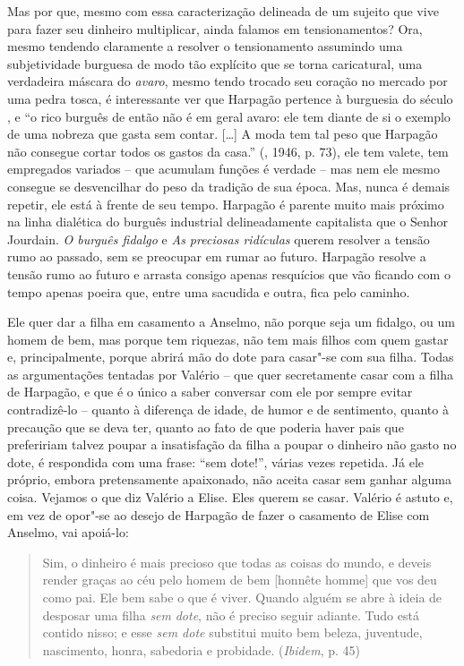 Mas por que, mesmo com essa caracterização delineada de um sujeito que
vive para fazer seu dinheiro multiplicar, ainda falamos em
tensionamentos? Ora, mesmo tendendo claramente a resolver o
tensionamento assumindo uma subjetividade burguesa de modo tão explícito
que se torna caricatural, uma verdadeira máscara do \emph{avaro}, mesmo
tendo trocado seu coração no mercado por uma pedra tosca, é interessante
ver que Harpagão pertence à burguesia do século , e ``o rico burguês
de então não é em geral avaro: ele tem diante de si o exemplo de uma
nobreza que gasta sem contar. [\ldots{}] A moda tem tal peso que
Harpagão não consegue cortar todos os gastos da casa.'' (, 1946,
p. 73), ele tem valete, tem empregados variados -- que acumulam funções
é verdade -- mas nem ele mesmo consegue se desvencilhar do peso da
tradição de sua época. Mas, nunca é demais repetir, ele está à frente de
seu tempo. Harpagão é parente muito mais próximo na linha dialética do
burguês industrial delineadamente capitalista que o Senhor Jourdain.
\emph{O burguês fidalgo} e \emph{As preciosas ridículas} querem resolver
a tensão rumo ao passado, sem se preocupar em rumar ao futuro. Harpagão
resolve a tensão rumo ao futuro e arrasta consigo apenas resquícios que
vão ficando com o tempo apenas poeira que, entre uma sacudida e outra,
fica pelo caminho.

Ele quer dar a filha em casamento a Anselmo, não porque seja um fidalgo,
ou um homem de bem, mas porque tem riquezas, não tem mais filhos com
quem gastar e, principalmente, porque abrirá mão do dote para casar"-se
com sua filha. Todas as argumentações tentadas por Valério -- que quer
secretamente casar com a filha de Harpagão, e que é o único a saber
conversar com ele por sempre evitar contradizê-lo -- quanto à diferença
de idade, de humor e de sentimento, quanto à precaução que se deva ter,
quanto ao fato de que poderia haver pais que prefeririam talvez poupar a
insatisfação da filha a poupar o dinheiro não gasto no dote, é
respondida com uma frase: ``sem dote!'', várias vezes repetida. Já ele
próprio, embora pretensamente apaixonado, não aceita casar sem ganhar
alguma coisa. Vejamos o que diz Valério a Elise. Eles querem se casar.
Valério é astuto e, em vez de opor"-se ao desejo de Harpagão de fazer o
casamento de Elise com Anselmo, vai apoiá-lo:

\begin{quote}
Sim, o dinheiro é mais precioso que todas as coisas do mundo, e deveis
render graças ao céu pelo homem de bem [honnête homme] que vos deu
como pai. Ele bem sabe o que é viver. Quando alguém se abre à ideia de
desposar uma filha \emph{sem} \emph{dote}, não é preciso seguir adiante.
Tudo está contido nisso; e esse \emph{sem dote} substitui muito bem
beleza, juventude, nascimento, honra, sabedoria e probidade.
(\emph{Ibidem}, p. 45)
\end{quote}

